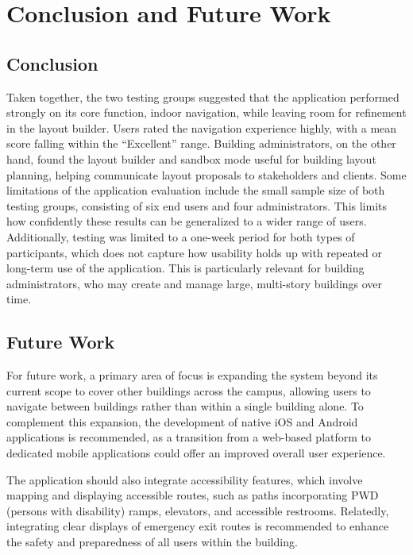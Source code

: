 \chapter[CONCLUSION AND FUTURE WORK]{Conclusion and Future Work}\label{ch:V}

\section{Conclusion}\label{sec:5.1}

Taken together, the two testing groups suggested that the application performed
strongly on its core function, indoor navigation, while leaving room for
refinement in the layout builder. Users rated the navigation experience highly,
with a mean score falling within the ``Excellent'' range. Building
administrators, on the other hand, found the layout builder and sandbox mode
useful for building layout planning, helping communicate layout proposals to
stakeholders and clients. Some limitations of the application evaluation include
the small sample size of both testing groups, consisting of six end users and
four administrators. This limits how confidently these results can be
generalized to a wider range of users. Additionally, testing was limited to a
one-week period for both types of participants, which does not capture how
usability holds up with repeated or long-term use of the application. This is
particularly relevant for building administrators, who may create and manage
large, multi-story buildings over time.

\section{Future Work}\label{sec:5.2}

For future work, a primary area of focus is expanding the system beyond its
current scope to cover other buildings across the campus, allowing users to
navigate between buildings rather than within a single building alone. To
complement this expansion, the development of native iOS and Android
applications is recommended, as a transition from a web-based platform to
dedicated mobile applications could offer an improved overall user experience.

The application should also integrate accessibility features, which involve
mapping and displaying accessible routes, such as paths incorporating PWD
(persons with disability) ramps, elevators, and accessible restrooms. Relatedly,
integrating clear displays of emergency exit routes is recommended to enhance
the safety and preparedness of all users within the building.

